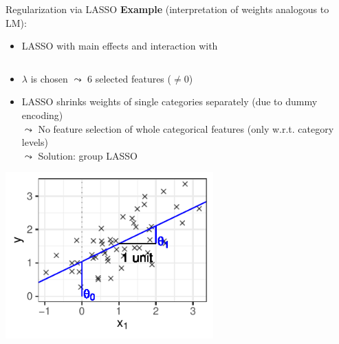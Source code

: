 \documentclass[11pt,compress,t,notes=noshow, aspectratio=169, xcolor=table]{beamer}
\begin{document}
\begin{frame}{Regularization via LASSO }
\textbf{Example} (interpretation of weights analogous to LM):

\begin{itemize}
    \item LASSO with main effects and interaction  with 
\end{itemize}
\vspace{-0.5\topsep}
\begin{columns}[c, totalwidth=\linewidth]
\begin{column}{0.65\textwidth}
\begin{itemize}
    \item $\lambda$ is chosen $\leadsto$ 6 selected features ($\neq 0$)
    \item LASSO shrinks weights of single categories separately (due to dummy encoding)\\
    $\leadsto$ No feature selection of whole categorical features (only w.r.t. category levels)\\
    $\leadsto$ Solution: group LASSO 
\end{itemize}
\smallskip
\centering
\includegraphics[width = 0.6\textwidth]{figure/reg_lm_plot_interpreted.pdf}


\end{column}
\end{columns}
\end{frame}
\end{document}
